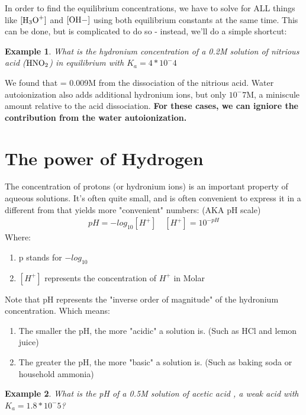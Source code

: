 \documentclass{article}  %
\newtheorem{exmp}{Example}
\begin{document}
In order to find the equilibrium concentrations, we have to solve for ALL things like $\ce{[H3O+]}$ and $\ce{[OH-]}$ using both equilibrium constants at the same time. 
\newline
This can be done, but is complicated to do so - instead, we'll do a simple shortcut:

\begin{exmp}
    What is the hydronium concentration of a 0.2M solution of nitrious acid ($\ce{HNO2}$) in equilibrium with $K_a = 4*10^-4$
\end{exmp}
We found that \ce{[H3O+]} = 0.009M from the dissociation of the nitrious acid. Water autoionization also adds additional hydronium ions, but only $10^-7$M, a miniscule amount relative to the acid dissociation.
\newline
\textbf{For these cases, we can igniore the contribution from the water autoionization.}

\section*{The power of Hydrogen}
The concentration of protons (or hydronium ions) is an important property of aqueous solutions. It's often quite small, and is often convenient to express it in a different from that yields more "convenient" numbers: (AKA pH scale)
\begin{equation*}
    \begin{aligned}
        pH = -log_{10}[H^+] \quad [H^+] = 10^{-pH}
    \end{aligned}
\end{equation*}
Where:
\begin{enumerate}
    \item p stands for $-log_10$
    \item $[H^+]$ represents the concentration of $H^+$ in Molar
\end{enumerate}
Note that pH represents the "inverse order of magnitude" of the hydronium concentration. Which means:
\begin{enumerate}
    \item The smaller the pH, the more "acidic" a solution is. (Such as HCl and lemon juice)
    \item The greater the pH, the more "basic" a solution is. (Such as baking soda or household ammonia)
\end{enumerate}

\begin{exmp}
    What is the pH of a 0.5M solution of acetic acid , a weak acid with $K_a = 1.8*10^-5$?
\end{exmp}
\end{document}
